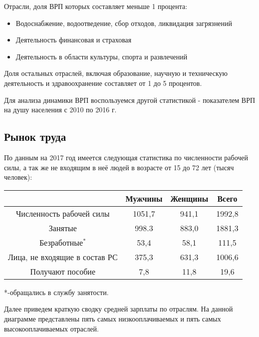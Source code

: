 Отрасли, доля ВРП которых составляет меньше 1 процента:
\begin{itemize}
	\item Водоснабжение, водоотведение, сбор отходов, ликвидация загрязнений
	\item Деятельность финансовая и страховая
	\item Деятельность в области культуры, спорта и развлечений
\end{itemize}

Доля остальных отраслей, включая образование, научную и техническую деятельность и здравоохранение составляет от 1 до 5 процентов.

Для анализа динамики ВРП воспользуемся другой статистикой - показателем ВРП на душу населения с 2010 по 2016 г.

\subsection{Рынок труда}
По данным на 2017 год имеется следующая статистика по численности рабочей силы, а так же не входящим в неё людей в возрасте от 15 до 72 лет (тысяч человек):

\begin{tabular}{|c|c|c|c|}
	\hline
	& Мужчины & Женщины & Всего \\
	\hline
	Численность рабочей силы & 1051,7 & 941,1 &  1992,8 \\
	\hline
	Занятые & 998.3 & 883,0 & 1881,3 \\
	\hline
	Безработные$ ^*$ & 53,4 & 58,1 & 111,5 \\
	\hline
	Лица, не входящие в состав РС & 375,3 & 631,3 & 1006,6 \\
	\hline
	Получают пособие & 7,8 & 11,8 & 19,6\\
	\hline
\end{tabular}

*-обращались в службу занятости.


Далее приведем краткую сводку средней зарплаты по отраслям. На данной диаграмме представлены пять самых низкооплачиваемых  и пять самых высокооплачиваемых отраслей.



